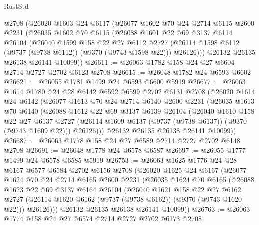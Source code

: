 \begin{lexlean}{RustStd}
\begin{coremodule}
    @2708
    (@26020
      @1603
      @24
      @6117
      (@26077
        @1602
        @70
        @24
        @2714
        @6115
        @2600
        @2231
        (@26035
          @1602
          @70
          @6115
          (@26088
            @1601
            @22
            @69
            @3137
            @6114
            @26104
            (@26040
              @1599
              @158
              @22
              @27
              @6112
              @2727
              (@26114 @1598 @6112 (@9737 (@9738 @6112)) (@9370 (@9743 @1598 @22)))
              @26126)))
        @26132
        @26135
        @26138
        @26141
        @10099))
@26611 := @26063 @1782 @158 @24 @27 @6604 @2714 @2727 @2702 @6123 @2708
@26615 := @26048 @1782 @24 @6593 @6602
@26621 := @26055 @1781 @1499 @24 @6593 @6600 @5919
@26677 := @26063
    @1614
    @1780
    @24
    @28
    @6142
    @6592
    @6599
    @2702
    @6131
    @2708
    (@26020
      @1614
      @24
      @6142
      (@26077
        @1613
        @70
        @24
        @2714
        @6140
        @2600
        @2231
        (@26035
          @1613
          @70
          @6140
          (@26088
            @1612
            @22
            @69
            @3137
            @6139
            @26104
            (@26040
              @1610
              @158
              @22
              @27
              @6137
              @2727
              (@26114 @1609 @6137 (@9737 (@9738 @6137)) (@9370 (@9743 @1609 @22)))
              @26126)))
        @26132
        @26135
        @26138
        @26141
        @10099))
@26687 := @26063 @1778 @158 @24 @27 @6589 @2714 @2727 @2702 @6148 @2708
@26691 := @26048 @1778 @24 @6578 @6587
@26697 := @26055 @1777 @1499 @24 @6578 @6585 @5919
@26753 := @26063
    @1625
    @1776
    @24
    @28
    @6167
    @6577
    @6584
    @2702
    @6156
    @2708
    (@26020
      @1625
      @24
      @6167
      (@26077
        @1624
        @70
        @24
        @2714
        @6165
        @2600
        @2231
        (@26035
          @1624
          @70
          @6165
          (@26088
            @1623
            @22
            @69
            @3137
            @6164
            @26104
            (@26040
              @1621
              @158
              @22
              @27
              @6162
              @2727
              (@26114 @1620 @6162 (@9737 (@9738 @6162)) (@9370 (@9743 @1620 @22)))
              @26126)))
        @26132
        @26135
        @26138
        @26141
        @10099))
@26763 := @26063 @1774 @158 @24 @27 @6574 @2714 @2727 @2702 @6173 @2708

\end{coremodule}
\end{lexlean}
